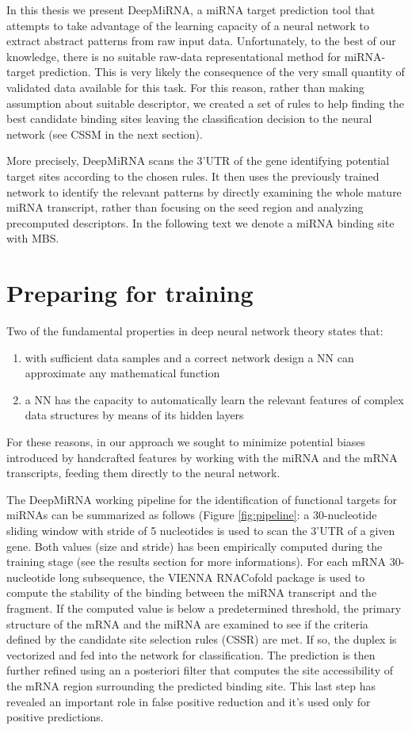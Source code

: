 In this thesis we present DeepMiRNA, a miRNA target prediction tool that attempts to take advantage of the learning capacity of a neural network to extract abstract patterns from raw input data. Unfortunately, to the best of our knowledge, there is no suitable raw-data representational method for miRNA-target prediction. This is very likely the consequence of the very small quantity of validated data available for this task. For this reason, rather than making assumption about suitable descriptor, we created a set of rules to help finding the best candidate binding sites leaving the classification decision to the neural network (see CSSM in the next section). 

More precisely, DeepMiRNA scans the 3'UTR of the gene identifying potential target sites according to the chosen rules. It then uses the previously trained network to identify the relevant patterns by directly examining the whole mature miRNA transcript, rather than focusing on the seed region and analyzing precomputed descriptors. In the following text we denote a miRNA binding site with MBS.

\section{Preparing for training}
Two of the fundamental properties in deep neural network theory states that:

\begin{enumerate}
	\item with sufficient data samples and a correct network design a NN can approximate any mathematical function
	\item a NN has the capacity to automatically learn the relevant features of complex data structures by means of its hidden layers \cite{dl}
\end{enumerate}

For these reasons, in our approach we sought to minimize potential biases introduced by handcrafted features by working  with the miRNA and the mRNA transcripts, feeding them directly to the neural network.

The DeepMiRNA working pipeline for the identification of functional targets for miRNAs can be summarized as follows (Figure \ref{fig:pipeline}: a 30-nucleotide sliding window with stride of 5 nucleotides is used to scan the 3'UTR of a given gene. Both values (size and stride) has been empirically computed during the training stage (see the results section for more informations). For each mRNA 30-nucleotide long subsequence, the VIENNA RNACofold package \cite{vienna_rna} is used to compute the stability of the binding between the miRNA transcript and the fragment. If the computed value is below a predetermined threshold, the primary structure of the mRNA and the miRNA are examined to see if the criteria defined by the candidate site selection rules (CSSR) are met. If so, the duplex is vectorized and fed into the network for classification. The prediction is then further refined using an a posteriori filter that computes the site accessibility of the mRNA region surrounding the predicted binding site. This last step has revealed an important role in false positive reduction and it's used only for positive predictions.

